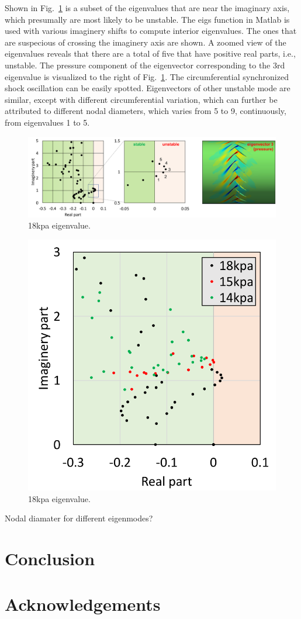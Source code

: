 \documentclass[journal,final]{new-aiaa}
\begin{document}
Shown in Fig.~\ref{fig:r67-eigen-18kpa} is a subset of the eigenvalues
that are near the imaginary axis, which presumally are most likely to
be unstable. The eigs function in Matlab is used with various
imaginery shifts to compute interior eigenvalues. The ones that
are suspecious of crossing the imaginery axis are shown. A zoomed
view of the eigenvalues reveals that there are a total of five that
have positive real parts, i.e., unstable. The pressure component
of the eigenvector corresponding to the 3rd eigenvalue is
visualized to the right of Fig.~\ref{fig:r67-eigen-18kpa}. The
circumferential synchronized shock oscillation can be easily spotted.
Eigenvectors of other unstable mode are similar, except with different
circumferential variation, which can further be attributed to different
nodal diameters, which varies from 5 to 9, continuously, from eigenvalues
1 to 5.



\begin{figure}[htb]
	\centering   
	\includegraphics[width=\textwidth]{pic/rotor67-2d-eigenvalue-18kpa.png}
	\caption{18kpa eigenvalue.}
	\label{fig:r67-eigen-18kpa}
\end{figure}


\begin{figure}[htb]
	\centering   
	\includegraphics[width=.5\textwidth]{pic/eigenvalue-14-18kpa.png}
	\caption{18kpa eigenvalue.}
	\label{fig:r67-eigen-14-18kpa}
\end{figure}



Nodal diamater for different eigenmodes?

\section{Conclusion}
\label{conclusion}

\section*{Acknowledgements}


\end{document}
